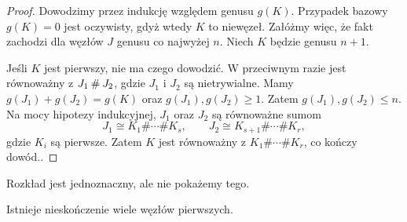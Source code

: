 \begin{proof}
    Dowodzimy przez indukcję względem genusu $g(K)$.
    Przypadek bazowy $g(K) = 0$ jest oczywisty, gdyż wtedy $K$ to niewęzeł.
    Załóżmy więc, że fakt zachodzi dla węzłów $J$ genusu co najwyżej $n$. 
    Niech $K$ będzie genusu $n + 1$.

    Jeśli $K$ jest pierwszy, nie ma czego dowodzić.
    W przeciwnym razie jest równoważny z $J_1 \mathbin{\#} J_2$, gdzie $J_1$ i $J_2$ są nietrywialne.
    Mamy $g(J_1)+g(J_2)=g(K)$ oraz $g(J_1),g(J_2)\geqslant 1$.
    Zatem $g(J_1),g(J_2)\leqslant n$.
    Na mocy hipotezy indukcyjnej, $J_1$ oraz $J_2$ są równoważne sumom
    \[
        J_1 \cong K_1\#\cdots\# K_s,\qquad 
        J_2 \cong K_{s+1}\#\cdots\# K_r,
    \]
    gdzie $K_i$ są pierwsze.
    Zatem $K$ jest równoważny z $K_1\#\cdots\# K_r$, co kończy dowód..
\end{proof}

Rozkład jest jednoznaczny, ale nie pokażemy tego.

\begin{proposition} \label{infty_primes}
Istnieje nieskończenie wiele węzłów pierwszych.
\end{proposition}

